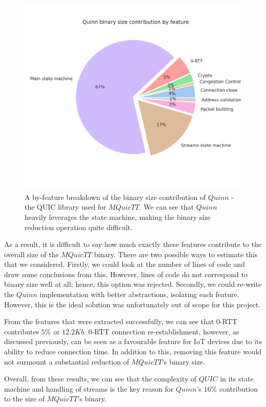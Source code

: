 \begin{figure}[t]
    \centering
    \includegraphics[width=0.75\linewidth]{images/mquictt_binary_by_function.png}
    \caption{A by-feature breakdown of the binary size contribution of $Quinn$ - the QUIC library used for $MQuicTT$. We can see that $Quinn$ heavily leverages the state machine, making the binary size reduction operation quite difficult.}
    \label{fig:mquictt_bin_func}
\end{figure}

As a result, it is difficult to say how much exactly these features contribute to the overall size of the $MQuicTT$ binary.
There are two possible ways to estimate this that we considered.
Firstly, we could look at the number of lines of code and draw some conclusions from this.
However, lines of code do not correspond to binary size well at all; hence, this option was rejected.
Secondly, we could re-write the $Quinn$ implementation with better abstractions, isolating each feature.
However, this is the ideal solution was unfortunately out of scope for this project.

From the features that were extracted successfully, we can see that 0-RTT contributes $5\%$ or $12.2Kb$.
0-RTT connection re-establishment, however, as discussed previously, can be seen as a favourable feature for IoT devices due to its ability to reduce connection time.
In addition to this, removing this feature would not surmount a substantial reduction of $MQuicTT$'s binary size.

Overall, from these results, we can see that the complexity of $QUIC$ in its state machine and handling of streams is the key reason for $Quinn$'s $16\%$ contribution to the size of $MQuicTT$'s binary.

